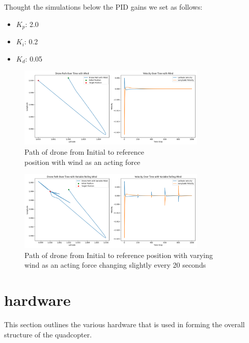 \documentclass{article}
\begin{document}
Thought the simulations below the PID gains we set as follows: 

\begin{itemize}
  \item \(K_p\): 2.0
  \item \(K_i\): 0.2
  \item \(K_d\): 0.05
\end{itemize}
\begin{figure}[H]
  \centering
  \includegraphics[width=0.8\textwidth]{Pictures/Drone_path_wind.png} 
  \caption{Path of drone from Initial to reference \\ position with wind as an acting force}
  \label{fig:Drone_path_wind}
\end{figure}

\begin{figure}[H]
  \centering
  \includegraphics[width=0.8\textwidth]{Pictures/Drone_path_wind_varys.png} 
  \captionsetup{justification=centering}
  \caption{Path of drone from Initial to reference position with varying\\ wind as an acting force changing slightly every 20 seconds}
  \label{fig:Drone_path_wind_varys}
\end{figure}

\section{hardware}\label{hardware}
This section outlines the various hardware that is used in forming the overall structure of the quadcopter.
\end{document}
